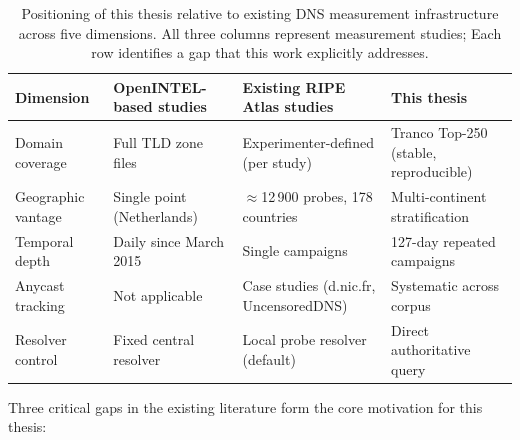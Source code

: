 \begin{table}[tp]
\centering
\small
\begin{tabularx}{\linewidth}{p{2.8cm} p{3.5cm} p{3.8cm} X}
\toprule
\textbf{Dimension} & \textbf{OpenINTEL-based studies}~\cite{vanRijswijk2016} & \textbf{Existing RIPE Atlas studies}~\cite{Bortzmeyer2013,Finnegan2018,Hours2016,Koch2021} & \textbf{This thesis} \\
\midrule
Domain coverage  & Full \ac{TLD} zone files & Experimenter-defined (per study) & Tranco Top-250 (stable, reproducible) \\
Geographic vantage    & Single point (Netherlands) & $\approx$12\,900 probes, 178 countries & Multi-continent stratification \\
Temporal depth & Daily since March 2015 & Single campaigns & 127-day repeated campaigns \\
Anycast tracking       & Not applicable & Case studies (d.nic.fr, UncensoredDNS) & Systematic across corpus \\
Resolver control   & Fixed central resolver & Local probe resolver (default) & Direct authoritative query \\
\bottomrule
\end{tabularx}
\caption{Positioning of this thesis relative to existing \ac{DNS} measurement infrastructure across five dimensions.
All three columns represent measurement studies; Each row identifies a gap that this work explicitly addresses.}
\label{tab:gap_analysis}
\end{table}

Three critical gaps in the existing literature form the core motivation for this thesis:

